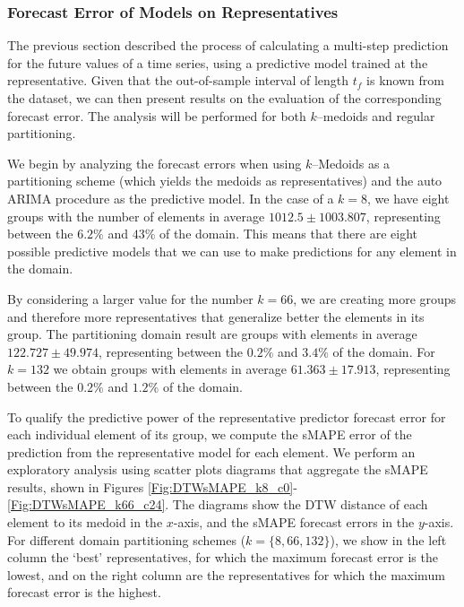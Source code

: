 \subsubsection{Forecast Error of Models on Representatives}
\label{Sec:AnalyzeForecastErrors}

The previous section described the process of calculating a multi-step prediction for the future values of a time series, using a predictive model trained at the representative. Given that the out-of-sample interval of length $t_f$ is known from the dataset, we can then present results on the evaluation of the corresponding forecast error. The analysis will be performed for both $k$--medoids and regular partitioning.

We begin by analyzing the forecast errors when using $k$--Medoids as a partitioning scheme (which yields the medoids as representatives) and the auto ARIMA procedure as the predictive model. In the case of a $k=8$, we have eight groups with the number of elements in average $1012.5 \pm 1003.807$, representing between the $6.2\%$ and $43\%$ of the domain. This means that there are eight possible predictive models that we can use to make predictions for any element in the domain.

By considering a larger value for the number $k=66$, we are creating more groups and therefore more representatives that generalize better the elements in its group. The partitioning domain result are groups with elements in average $122.727 \pm 49.974$, representing between the $0.2\%$ and $3.4\%$ of the domain. For $k=132$ we obtain groups with elements in average $61.363 \pm 17.913$, representing between the $0.2\%$ and $1.2\%$ of the domain.

To qualify the predictive power of the representative predictor forecast error for each individual element of its group, we compute the sMAPE error of the prediction from the representative model for each element.%
We perform an exploratory analysis using scatter plots diagrams that aggregate the sMAPE results, shown in Figures \ref{Fig:DTWsMAPE_k8_c0}-\ref{Fig:DTWsMAPE_k66_c24}. %
The diagrams show the DTW distance of each element to its medoid in the $x$-axis, and the sMAPE forecast errors in the $y$-axis. For different domain partitioning schemes ($k=\{8, 66, 132\}$), we show in the left column the `best' representatives, for which the maximum forecast error is the lowest, and on the right column are the representatives for which the maximum forecast error is the highest.

